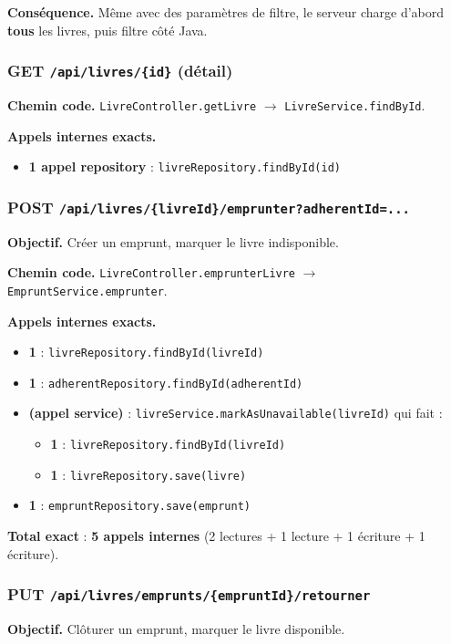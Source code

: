 \textbf{Conséquence.} Même avec des paramètres de filtre, le serveur charge d'abord \textbf{tous} les livres, puis filtre côté Java.

\subsubsection{GET \texttt{/api/livres/\{id\}} (détail)}
\textbf{Chemin code.} \texttt{LivreController.getLivre} $\rightarrow$ \texttt{LivreService.findById}.

\textbf{Appels internes exacts.}
\begin{itemize}[leftmargin=1.5cm]
  \item \textbf{1 appel repository} : \texttt{livreRepository.findById(id)}
\end{itemize}

\subsubsection{POST \texttt{/api/livres/\{livreId\}/emprunter?adherentId=...}}
\textbf{Objectif.} Créer un emprunt, marquer le livre indisponible.

\textbf{Chemin code.} \texttt{LivreController.emprunterLivre} $\rightarrow$ \texttt{EmpruntService.emprunter}.

\textbf{Appels internes exacts.}
\begin{itemize}[leftmargin=1.5cm]
  \item \textbf{1} : \texttt{livreRepository.findById(livreId)}
  \item \textbf{1} : \texttt{adherentRepository.findById(adherentId)}
  \item \textbf{(appel service)} : \texttt{livreService.markAsUnavailable(livreId)} qui fait :
    \begin{itemize}[leftmargin=1.5cm]
      \item \textbf{1} : \texttt{livreRepository.findById(livreId)}
      \item \textbf{1} : \texttt{livreRepository.save(livre)}
    \end{itemize}
  \item \textbf{1} : \texttt{empruntRepository.save(emprunt)}
\end{itemize}

\textbf{Total exact} : \textbf{5 appels internes} (2 lectures + 1 lecture + 1 écriture + 1 écriture).

\subsubsection{PUT \texttt{/api/livres/emprunts/\{empruntId\}/retourner}}
\textbf{Objectif.} Clôturer un emprunt, marquer le livre disponible.


